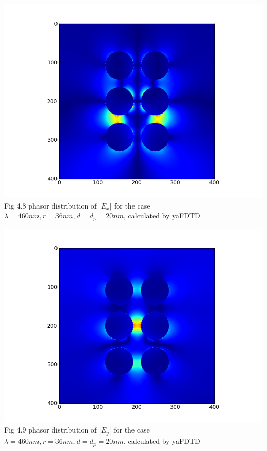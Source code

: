 \documentclass[openany]{book}
\begin{document}
\begin{center}
\includegraphics[scale=0.8]{images/ex.png}\\
Fig 4.8
phasor distribution of $|E_x|$ for the case $\lambda = 460nm, r = 36nm, d = d_p = 20nm$, calculated by yaFDTD
\end{center}

\begin{center}
\includegraphics[scale=0.8]{images/ey.png}\\
Fig 4.9
phasor distribution of $|E_y|$ for the case $\lambda = 460nm, r = 36nm, d = d_p = 20nm$, calculated by yaFDTD
\end{center}
\end{document}
